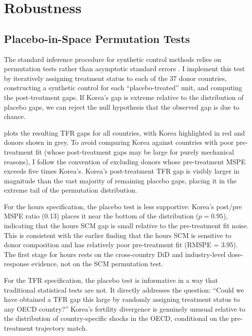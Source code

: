 \documentclass[12pt]{article}
\begin{document}
\section{Robustness}

\subsection{Placebo-in-Space Permutation Tests}

The standard inference procedure for synthetic control methods relies on permutation tests rather than asymptotic standard errors \citep{abadie2010synthetic}. I implement this test by iteratively assigning treatment status to each of the 37 donor countries, constructing a synthetic control for each ``placebo-treated'' unit, and computing the post-treatment gaps. If Korea's gap is extreme relative to the distribution of placebo gaps, we can reject the null hypothesis that the observed gap is due to chance.

 plots the resulting TFR gaps for all countries, with Korea highlighted in red and donors shown in grey. To avoid comparing Korea against countries with poor pre-treatment fit (whose post-treatment gaps may be large for purely mechanical reasons), I follow the convention of excluding donors whose pre-treatment MSPE exceeds five times Korea's. Korea's post-treatment TFR gap is visibly larger in magnitude than the vast majority of remaining placebo gaps, placing it in the extreme tail of the permutation distribution.

For the hours specification, the placebo test is less supportive: Korea's post/pre MSPE ratio (0.13) places it near the bottom of the distribution ($p = 0.95$), indicating that the hours SCM gap is small relative to the pre-treatment fit noise. This is consistent with the earlier finding that the hours SCM is sensitive to donor composition and has relatively poor pre-treatment fit (RMSPE = 3.95). The first stage for hours rests on the cross-country DiD and industry-level dose-response evidence, not on the SCM permutation test.

For the TFR specification, the placebo test is informative in a way that traditional statistical tests are not. It directly addresses the question: ``Could we have obtained a TFR gap this large by randomly assigning treatment status to any OECD country?'' Korea's fertility divergence is genuinely unusual relative to the distribution of country-specific shocks in the OECD, conditional on the pre-treatment trajectory match.
\end{document}

